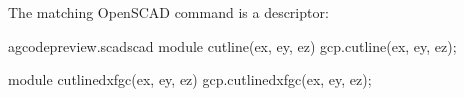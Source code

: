 \documentclass{ltxdoc}
\begin{document}
%
%   
%
%

The matching OpenSCAD command is a descriptor:

\lstset{firstnumber=\thegcpscad}
\begin{writecode}{a}{gcodepreview.scad}{scad}
module cutline(ex, ey, ez){
    gcp.cutline(ex, ey, ez);
}

module cutlinedxfgc(ex, ey, ez){
    gcp.cutlinedxfgc(ex, ey, ez);
}

\end{writecode}
\addtocounter{gcpscad}{4}      
\end{document}
